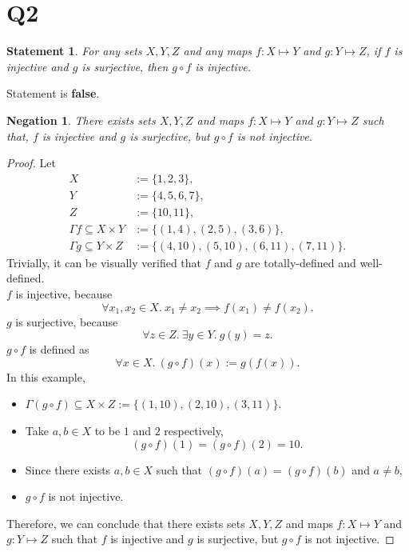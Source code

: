 \documentclass[12pt]{article}
\newtheorem*{stmt}{Statement}
\newtheorem*{negstmt}{Negation}
\begin{document}
\section*{Q2}
\begin{stmt}
    For any sets $X,Y,Z$ and any maps $f:X\mapsto Y$ and $g:Y\mapsto Z$,
    if $f$ is injective and $g$ is surjective, then $g\circ f$ is injective.
\end{stmt}
Statement is \textbf{false}.
\begin{negstmt}
    There exists sets $X,Y,Z$ and maps $f:X\mapsto Y$ and $g:Y\mapsto Z$ such that,
    $f$ is injective and $g$ is surjective, but $g\circ f$ is not injective.
\end{negstmt}
\begin{proof}
    Let
    \begin{align*}
        X &:= \{1, 2, 3\},\\
        Y &:=\{4, 5, 6, 7\},\\
        Z &:=\{10, 11\},\\
        \Gamma f \subseteq X\times Y &:=\{(1,4),(2,5),(3,6)\},\\
        \Gamma g \subseteq Y\times Z &:=\{(4,10), (5,10), (6,11), (7,11)\}.
    \end{align*}
    Trivially, it can be visually verified that $f$ and $g$ are totally-defined and well-defined.\\
    $f$ is injective, because
        $$\forall x_1,x_2 \in X.~ x_1 \neq x_2 \implies f(x_1) \neq f(x_2).$$
    $g$ is surjective, because
        $$\forall z \in Z.~ \exists y \in Y.~ g(y) = z.$$
    $g\circ f$ is defined as $$\forall x \in X.~ (g\circ f)(x) := g(f(x)).$$
    In this example,
    \begin{itemize}[label={}]
        \item $\Gamma (g \circ f) \subseteq X \times Z := \{(1,10),(2,10),(3,11)\}$.
        \item Take $a,b \in X$ to be $1$ and $2$ respectively,
            $$(g \circ f)(1) = (g \circ f)(2) = 10.$$
        \item Since there exists $a,b \in X$ such that $(g\circ f)(a) = (g \circ f)(b)$ and $a \neq b$,
        \item $g \circ f$ is not injective.
    \end{itemize}
    Therefore, we can conclude that there exists sets $X,Y,Z$ and maps $f:X\mapsto Y$ and $g:Y\mapsto Z$ such that $f$ is injective and $g$ is surjective, but $g\circ f$ is not injective.
\end{proof}
\newpage
\end{document}
